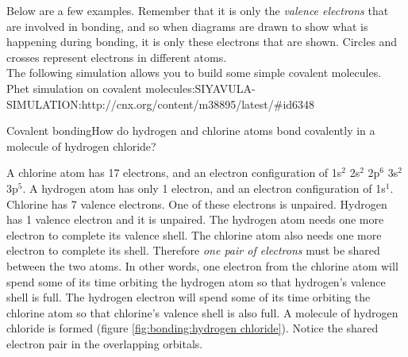 Below are a few examples. Remember that it is only the \textit{valence electrons} that are involved in bonding, and so when diagrams are drawn to show what is happening during bonding, it is only these electrons that are shown. Circles and crosses represent electrons in different atoms.\\
The following simulation allows you to build some simple covalent molecules.
Phet simulation on covalent molecules:SIYAVULA-SIMULATION:http://cnx.org/content/m38895/latest/#id6348
\begin{wex}{Covalent bonding}{How do hydrogen and chlorine atoms bond covalently in a molecule of hydrogen chloride?}{
A chlorine atom has 17 electrons, and an electron configuration of 1s$^{2}$ 2s$^{2}$ 2p$^{6}$ 3s$^{2}$ 3p$^{5}$. A hydrogen atom has only 1 electron, and an electron configuration of 1s$^{1}$.
Chlorine has 7 valence electrons. One of these electrons is unpaired. Hydrogen has 1 valence electron and it is unpaired.
The hydrogen atom needs one more electron to complete its valence shell. The chlorine atom also needs one more electron to complete its shell. Therefore \textit{one pair of electrons} must be shared between the two atoms. In other words, one electron from the chlorine atom will spend some of its time orbiting the hydrogen atom so that hydrogen's valence shell is full. The hydrogen electron will spend some of its time orbiting the chlorine atom so that chlorine's valence shell is also full. A molecule of hydrogen chloride is formed (figure \ref{fig:bonding:hydrogen chloride}). Notice the shared electron pair in the overlapping orbitals.
\begin{figure}[H]
\begin{center}
\end{center}
\end{figure}}
\end{wex}
